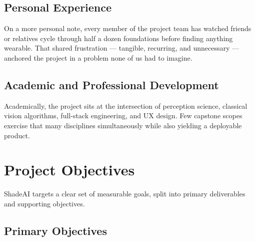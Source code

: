 \subsection{Personal Experience}

On a more personal note, every member of the project team has watched friends or relatives cycle through half a dozen foundations before finding anything wearable. That shared frustration — tangible, recurring, and unnecessary — anchored the project in a problem none of us had to imagine.

\subsection{Academic and Professional Development}

Academically, the project sits at the intersection of perception science, classical vision algorithms, full-stack engineering, and UX design. Few capstone scopes exercise that many disciplines simultaneously while also yielding a deployable product.

\section{Project Objectives}

ShadeAI targets a clear set of measurable goals, split into primary deliverables and supporting objectives.

\subsection{Primary Objectives}

